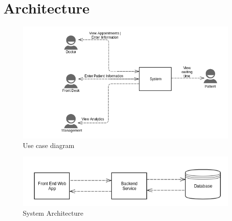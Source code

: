 \section*{Architecture}
\begin{figure}[h]
	\includegraphics[scale=0.4]{use-case.png}
	\centering
	\caption*{Use case diagram}
\end{figure}

\begin{figure}[h]
	\includegraphics[scale=0.5]{system_architecture.png} 
	\centering
	\caption*{System Architecture}
\end{figure}